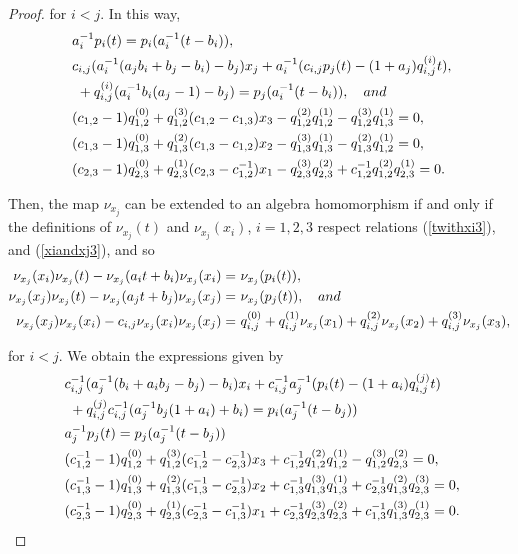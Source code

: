 \documentclass{amsart}
\theoremstyle{definition}
\theoremstyle{remark}
\numberwithin{equation}{section}
\begin{document}
\begin{proof}
for $i < j$. In this way, 
\begin{align}
   &\ a_{i}^{-1}p_i(t)=p_i(a_{i}^{-1}(t-b_i)), \label{Firstnux13} \\
   &\ c_{i,j}(a_i^{-1}(a_jb_i+b_j-b_i)-b_j)x_j+a_i^{-1}(c_{i,j}p_j(t)-(1+a_j)q_{i,j}^{(i)}t), \notag \\
   &\ \ +q_{i,j}^{(i)}(a_i^{-1}b_i(a_j-1)-b_j)=p_j(a_i^{-1}(t-b_i)), \quad {\rm and} \label{Secondnux13}\\
   &\ (c_{1,2}-1)q_{1,2}^{(0)}+q_{1,2}^{(3)}(c_{1,2}-c_{1,3})x_3-q_{1,2}^{(2)}q_{1,2}^{(1)}-q_{1,2}^{(3)}q_{1,3}^{(1)} = 0, \notag \\
   &\ (c_{1,3}-1)q_{1,3}^{(0)}+q_{1,3}^{(2)}(c_{1,3}-c_{1,2})x_2-q_{1,3}^{(3)}q_{1,3}^{(1)}-q_{1,3}^{(2)}q_{1,2}^{(1)} = 0, \notag \\
   &\ (c_{2,3}-1)q_{2,3}^{(0)}+q_{2,3}^{(1)}(c_{2,3}-c_{1,2}^{-1})x_1-q_{2,3}^{(3)}q_{2,3}^{(2)}+c_{1,2}^{-1}q_{1,2}^{(2)}q_{2,3}^{(1)} = 0 .\label{Thirnux13}
\end{align}

Then, the map $\nu_{x_j}$ can be extended to an algebra homomorphism if and only if the definitions of $\nu_{x_j}(t)$ and $\nu_{x_j}(x_i)$, $i=1, 2, 3$ respect relations {\rm (}\ref{twithxi3}{\rm )}, and {\rm (}\ref{xiandxj3}{\rm )}, and so
{\small{
\begin{align*}
   \nu_{x_j}(x_i)\nu_{x_j}(t)-\nu_{x_j}(a_it+b_i)\nu_{x_j}(x_i) = &\ \nu_{x_j}(p_i(t)), \\
   \nu_{x_j}(x_j)\nu_{x_j}(t)-\nu_{x_j}(a_jt+b_j)\nu_{x_j}(x_j) = &\ \nu_{x_j}(p_j(t)), \quad {\rm and} \\
   \nu_{x_j}(x_j)\nu_{x_j}(x_i)-c_{i,j}\nu_{x_j}(x_i)\nu_{x_j}(x_j) = &\ q_{i,j}^{(0)}+q_{i,j}^{(1)}\nu_{x_j}(x_1)+q_{i,j}^{(2)}\nu_{x_j}(x_2)+q_{i,j}^{(3)}\nu_{x_j}(x_3),
\end{align*}
}}

for $i < j$. We obtain the expressions given by
\begin{align}
   &\  c_{i,j}^{-1}(a_j^{-1}(b_i+a_ib_j-b_j)-b_i)x_i+c_{i,j}^{-1}a_j^{-1}(p_i(t)-(1+a_i)q_{i,j}^{(j)}t) \notag\\
   &\ \ +q_{i,j}^{(j)}c_{i,j}^{-1}(a_j^{-1}b_j(1+a_i)+b_i)=p_i(a_j^{-1}(t-b_j)) \label{Firstnux23}\\
   &\  a_{j}^{-1}p_j(t)=p_j(a_{j}^{-1}(t-b_j)) \label{Secondnux23} \\
   &\ (c_{1,2}^{-1}-1)q_{1,2}^{(0)}+q_{1,2}^{(3)}(c_{1,2}^{-1}-c_{2,3}^{-1})x_3+c_{1,2}^{-1}q_{1,2}^{(2)}q_{1,2}^{(1)}-q_{1,2}^{(3)}q_{2,3}^{(2)} = 0, \notag \\
   &\ (c_{1,3}^{-1}-1)q_{1,3}^{(0)}+q_{1,3}^{(2)}(c_{1,3}^{-1}-c_{2,3}^{-1})x_2+c_{1,3}^{-1}q_{1,3}^{(3)}q_{1,3}^{(1)}+c_{2,3}^{-1}q_{1,3}^{(2)}q_{2,3}^{(3)} = 0, \notag \\
   &\ (c_{2,3}^{-1}-1)q_{2,3}^{(0)}+q_{2,3}^{(1)}(c_{2,3}^{-1}-c_{1,3}^{-1})x_1+c_{2,3}^{-1}q_{2,3}^{(3)}q_{2,3}^{(2)}+c_{1,3}^{-1}q_{1,3}^{(3)}q_{2,3}^{(1)} = 0 .\label{Thirnux23}
\end{align}


\end{proof}
\end{document}
